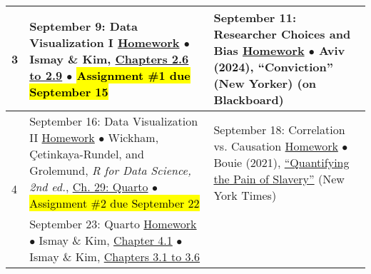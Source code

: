 \documentclass[12pt,letterpaper]{article}
\begin{document}
\begin{tabularx}{\textwidth}{|p{}|p{}||p{}|}

\hline
\multirow{10}{*}{3} &

September 9: Data Visualization I \newline \newline
\ul{Homework} \newline
$\bullet$ Ismay \& Kim, \href{https://moderndive.com/2-viz.html}{Chapters 2.6 to 2.9} \newline
$\bullet$ \hl{Assignment \#1 due September 15} &

September 11: Researcher Choices and Bias \newline \newline
\ul{Homework} \newline
$\bullet$ Aviv (2024), ``Conviction'' (New Yorker) (on Blackboard) \\


\hline
\multirow{5}{*}{4} &

September 16: Data Visualization II \newline \newline
\ul{Homework} \newline
$\bullet$ Wickham, Çetinkaya-Rundel, and Grolemund, \emph{R for Data Science, 2nd ed.}, \href{https://r4ds.hadley.nz/quarto}{Ch. 29: Quarto} \newline
$\bullet$ \hl{Assignment \#2 due September 22} &

September 18: Correlation vs. Causation \newline \newline
\ul{Homework} \newline
$\bullet$ Bouie (2021), \href{https://www.nytimes.com/2022/01/28/opinion/slavery-voyages-data-sets.html?unlocked_article_code=AAAAAAAAAAAAAAAACEIPuomT1JKd6J17Vw1cRCfTTMQmqxCdw_PIxftm3iWka3DMDmwSiOMNAo6B_EGKfq5qedYpznGFQ85IP7I0AfB70uYaJEFxUE-ovp6A0twjEhkClLiSDCkwzo6fGvcx6yPrZW20b7wunbDk5hmPdWXsUfbA1SZwLBI2pJRlaVz62nUClvzHErUm08Jsnqt0XuAMTjkKYCWOt_foGk8-bI3ANkeAn1FwD-JJWjjTnsqe66YBcWhRD1HGRHB95gUs-Y8WeYNXbOukcUlWKIepiq4RC2doMI6oG5QyIoDRnL5hurfJwgeeak8qYELPltMIK9ta2EiT_g\&smid=url-share}{``Quantifying the Pain of Slavery''} (New York Times) \\


\hline
\multirow{6}{*}{5} &

September 23: Quarto \newline \newline
\ul{Homework} \newline
$\bullet$ Ismay \& Kim, \href{https://moderndive.com/4-tidy.html}{Chapter 4.1} \newline
$\bullet$ Ismay \& Kim, \href{https://moderndive.com/3-wrangling.html}{Chapters 3.1 to 3.6} &


\end{tabularx}
\end{document}
